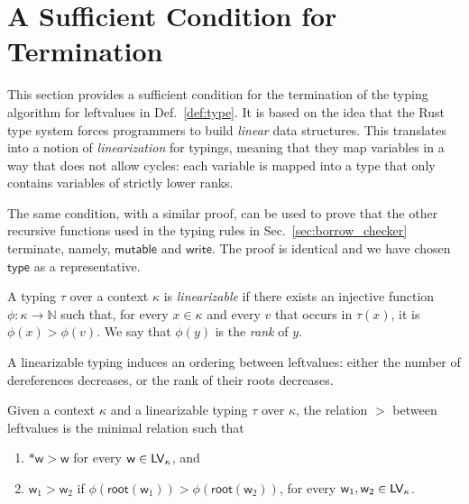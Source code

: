 \section{A Sufficient Condition for Termination}\label{sec:termination}

This section provides a sufficient condition for the termination of the
typing algorithm for leftvalues in Def.~\ref{def:type}. It is based on the
idea that the Rust type system forces programmers to build
\emph{linear} data structures. This translates into a notion of
\emph{linearization} for typings, meaning that they map
variables in a way that does not allow cycles: each variable is mapped
into a type that only contains variables of strictly lower ranks.

The same condition, with a similar proof, can be used to prove that
the other recursive functions used in the typing rules in Sec.~\ref{sec:borrow_checker}
terminate, namely, $\mathsf{mutable}$ and $\mathsf{write}$.
The proof is identical and we have chosen $\mathsf{type}$ as a representative.

\begin{definition}\label{def:linearization}
  A typing $\tau$ over a context $\kappa$ is \emph{linearizable} if there exists
  an injective function $\phi:\kappa\to\mathbb{N}$ such that, for every $x\in\kappa$ and every
  $v$ that occurs in $\tau(x)$, it is $\phi(x)>\phi(v)$. We say that $\phi(y)$ is the \emph{rank} of $y$.
\end{definition}

A linearizable typing induces an ordering between leftvalues: either
the number of dereferences decreases, or the rank of their roots decreases.

\begin{definition}\label{def:ordering}
  Given a context $\kappa$ and a linearizable typing $\tau$ over $\kappa$, the
  relation $>$ between leftvalues is the minimal relation such that
  \begin{enumerate}
  \item $\mathtt{*}\mathsf{w}>\mathsf{w}$ for every $\mathsf{w}\in\mathsf{LV}_\kappa$, and
  \item $\mathsf{w}_1>\mathsf{w}_2$ if
    $\phi(\mathsf{root}(\mathsf{w}_1))>\phi(\mathsf{root}(\mathsf{w}_2))$,
    for every $\mathsf{w}_1,\mathsf{w}_2\in\mathsf{LV}_\kappa$.
  \end{enumerate}
\end{definition}

